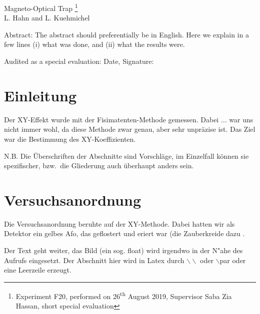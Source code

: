 \documentclass[12pt, a4paper]{article}
\begin{document}
\thispagestyle{empty}     %
\null\vspace{40mm}
\begin{center}
{%
\Large  Magneto-Optical Trap
\footnote{\noindent Experiment F20, performed on 26\textsuperscript{th} August 2019,
Supervisor Saba Zia Hassan,
short special evaluation}
}\\[15mm]
L. Hahn and L. Kuehmichel

\vspace{25mm}

\parbox{0.9\textwidth}{
Abstract:    
\small The abstract should preferentially be in English. Here we explain in a
few lines (i) what was done, and (ii) what the results were.
}
\end{center}

\vfill
Audited as a special evaluation: Date, Signature:
\vspace{20mm}

\null\thispagestyle{empty} 
   

\newpage

\section{Einleitung}
Der XY-Effekt wurde mit der Fisimatenten-Methode gemessen. Dabei $\ldots$ 
war uns nicht immer wohl, da diese Methode zwar genau, aber sehr unpr\"azise 
ist. Das Ziel war die Bestimmung des XY-Koeffizienten. 

N.B. Die \"Uberschriften der Abschnitte sind Vorschl\"age, im Einzelfall 
k\"onnen sie spezifischer, bzw.\ 
die Gliederung auch \"uberhaupt anders sein.

\section{Versuchsanordnung}

Die Versuchsanordnung beruhte auf der XY-Methode. Dabei hatten wir als
Detektor ein gelbes Afo, das geflostert und eriert war \cite{afo} (die Zauberkreide dazu .

Der Text geht weiter, das Bild (ein sog. float) wird irgendwo in der N"ahe des
Aufrufs eingesetzt. Der Abschnitt hier wird in Latex durch 
$\backslash\backslash$ oder $\backslash$par
oder eine Leerzeile erzeugt.
\end{document}
